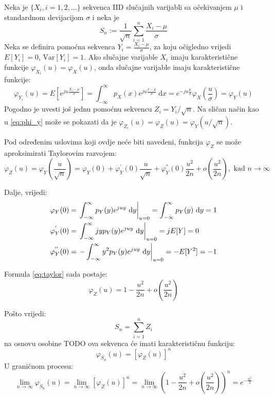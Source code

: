 Neka je $\{X_i, i=1,2,...\}$ sekvenca IID slučajnih varijabli sa očekivanjem
$\mu$ i standardnom devijacijom $\sigma$ i neka je
\begin{equation}
  S_n := \frac{1}{\sqrt{n}} \sum_{i=1}^{n} \frac{X_i-\mu}{\sigma}
\end{equation}
Neka se definira pomoćna sekvenca $Y_i = \frac{X_i-\mu}{\sigma}$, za koju
očigledno vrijedi $E[Y_i] = 0$, $\text{Var}[Y_i] = 1$. Ako slučajne varijable
$X_i$ imaju karakteristične funkcije $\varphi_{X_i}(u) = \varphi_X(u)$, onda
slučajne varijable imaju karakteristične funkcije:
\begin{equation} \label{eq:phi_y}
  \varphi_{Y_i}(u) = E\left[e^{ju\frac{X_i-\mu}{\sigma}}\right]
  = \int_{-\infty}^{\infty} p_X(x)e^{ju\frac{x-\mu}{\sigma}} \ \mathrm dx
  = e^{-ju\frac{\mu}{\sigma}} \varphi_X\left(\frac{u}{\sigma}\right)
  = \varphi_Y(u)
\end{equation}
Pogodno je uvesti još jednu pomoćnu sekvencu $Z_i = Y_i/\sqrt{n}$. Na sličan
način kao u \eqref{eq:phi_y} može se pokazati da je $\varphi_{Z_i}(u) =
\varphi_Z(u) = \varphi_Y(u/\sqrt{n})$.

Pod određenim uslovima koji ovdje neće biti navedeni, funkcija $\varphi_Z$ se
može aproksimirati Taylorovim razvojem:
\begin{equation} \label{eq:taylor}
  \varphi_Z(u) = \varphi_Y\left(\frac{u}{\sqrt{n}}\right) 
  = \varphi_Y(0) + \varphi_Y^{'}(0)\frac{u}{\sqrt{n}}
  + \varphi_Y^{''}(0)\frac{u^2}{2n} + o\left(\frac{u^2}{2n}\right),
    \text{ kad } n\to\infty
\end{equation}

Dalje, vrijedi:
\begin{align*}
  \varphi_Y(0)
    &= \left.\int_{-\infty}^{\infty} p_Y(y) e^{juy} \ \text dy\right|_{u=0}
    = \int_{-\infty}^{\infty} p_Y(y) \ \text dy = 1 \\
  \varphi_Y^{'}(0)
    &= \left.\int_{-\infty}^{\infty} jyp_Y(y)e^{juy} \ \text dy \right|_{u=0}
    = jE[Y] = 0 \\
  \varphi_Y^{''}(0)
    &= \left.-\int_{-\infty}^{\infty} y^2 p_Y(y)e^{juy} \ \text dy\right|_{u=0}
    = -E[Y^2] = -1
\end{align*}

Formula \eqref{eq:taylor} sada postaje:
\begin{equation}
  \varphi_Z(u) = 1 - \frac{u^2}{2n} + o\left(\frac{u^2}{2n}\right)
\end{equation}

Pošto vrijedi:
\begin{equation}
  S_n = \sum_{i=1}^{n} Z_i
\end{equation}
na osnovu osobine TODO ova sekvenca će imati karakterističnu funkciju:
\begin{equation}
  \varphi_{S_n}(u) = \left[\varphi_Z(u)\right]^n
\end{equation}
U graničnom procesu:
\begin{equation}
  \lim_{n\to\infty} \varphi_{S_n}(u)
  = \lim_{n\to\infty} [\varphi_Z(u)]^n
  = \lim_{n\to\infty}
    \left(1 - \frac{u^2}{2n} + o\left(\frac{u^2}{2n}\right)\right)^n
    = e^{-\frac{u^2}{2}}
\end{equation}

